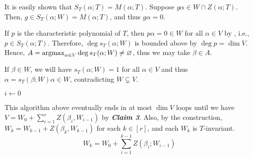 \documentclass[MAS212_Note.tex]{subfiles}
\begin{document}
{    

    It is easily shown that \(S_T(\alpha; T) = M(\alpha; T)\).
    Suppose \(g \alpha \in W \cap Z(\alpha; T)\).
    Then, \(g \in S_T(\alpha; W) = M(\alpha; T)\),
    and thus \(g \alpha = 0\). \checkmark
    


    If \(p\) is the characteristic polynomial of \(T\),
    then \(p \alpha = 0 \in W\) for all \(\alpha \in V\) by ,
    i.e., \(p \in S_T(\alpha; T)\).
    Therefore, \(\deg s_T(\alpha; W)\) is bounded above by \(\deg p = \dim V\).
    Hence, \(A = \operatorname*{arg max}_{\alpha \in V} \deg s_T(\alpha; W) \neq \varnothing\), thus we may
    take \(\beta \in A\).

    If \(\beta \in W\), we will have \(s_T(\alpha; W) = 1\) for all \(\alpha \in V\)
    and thus \(\alpha = s_T(\beta; W) \alpha \in W\),
    contradicting \(W \subsetneq V\). \checkmark\par
    {
        \setlength{\interspacetitleruled}{0pt}%
        \setlength{\algotitleheightrule}{0pt}%
        \LinesNumberedHidden%
        \begin{algorithm}[H]
            \(i \gets 0\)\;
        \end{algorithm}
    }

    This algorithm above eventually ends in at most \(\dim V\) loops
    until we have \(V = W_0 + \sum_{i=1}^{r} Z(\beta_i, W_{i-1})\) by \textbf{\textit{Claim 3}}.
    Also, by the construction, \(W_k = W_{k-1} + Z(\beta_k, W_{k-1})\)
    for each \(k \in [r]\),
    and each \(W_k\) is \(T\)-invariant.
    \[
        \textstyle W_k = W_0 + \sum_{i=1}^{k-1} Z(\beta_i; W_{i-1})
    \]

}
\end{document}
